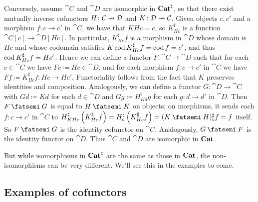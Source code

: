 \documentclass[Book-Poly]{subfiles}
\begin{document}
\begin{exercise}
\begin{solution}
Conversely, assume $\cat{C}$ and $\cat{D}$ are isomorphic in $\mathbf{Cat}^\sharp$, so that there exist mutually inverse cofunctors $H\colon\mathcal{C}\nrightarrow\mathcal{D}$ and $K\colon\mathcal{D}\nrightarrow\mathcal{C}$.
Given objects $c,c'$ and a morphism $f\colon c\to c'$ in $\cat{C}$, we have that $KHc=c$, so $K^\sharp_{Hc}$ is a function $\cat{C}[c]\to\cat{D}[Hc]$.
In particular, $K^\sharp_{Hc}f$ is a morphism in $\cat{D}$ whose domain is $Hc$ and whose codomain satisfies $K\operatorname{cod} K^\sharp_{Hc}f=\operatorname{cod} f=c'$, and thus $\operatorname{cod} K^\sharp_{Hc}f=Hc'$.
Hence we can define a functor $F\colon\cat{C}\to\cat{D}$ such that for each $c\in\cat{C}$ we have $Fc\coloneqq Hc\in\cat{D}$, and for each morphism $f\colon c\to c'$ in $\cat{C}$ we have $Ff\coloneqq K^\sharp_{Hc}f\colon Hc\to Hc'$.
Functoriality follows from the fact that $K$ preserves identities and composition.
Analogously, we can define a functor $G\colon\cat{D}\to\cat{C}$ with $Gd\coloneqq Kd$ for each $d\in\cat{D}$ and $Gg\coloneqq H^\sharp_{Kd}g$ for each $g\colon d\to d'$ in $\cat{D}$.
Then $F\then G$ is equal to $H\then K$ on objects; on morphisms, it sends each $f\colon c\to c'$ in $\cat{C}$ to $H^\sharp_{KHc}\left(K^\sharp_{Hc}f\right)=H^\sharp_c\left(K^\sharp_{Hc}f\right)=(K\then H)^\sharp_cf=f$ itself.
So $F\then G$ is the identity cofunctor on $\cat{C}$.
Analogously, $G\then F$ is the identity functor on $\cat{D}$.
Thus $\cat{C}$ and $\cat{D}$ are isomorphic in $\mathbf{Cat}$.
\end{solution}
\end{exercise}



But while isomorphisms in $\mathbf{Cat}^\sharp$ are the same as those in $\mathbf{Cat}$, the non-isomorphisms can be very different.
We'll see this in the examples to come.

\subsection{Examples of cofunctors}
\end{document}
